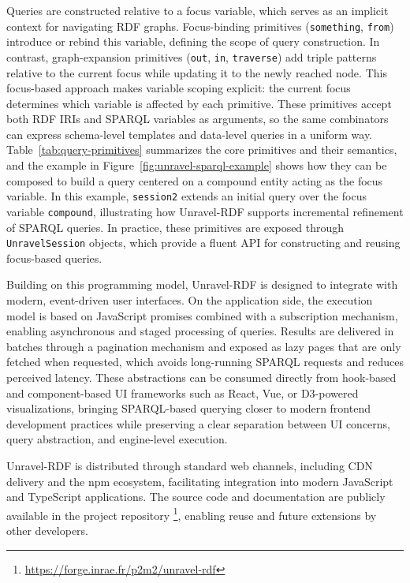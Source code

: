 \documentclass[
]{ceurart}
\begin{document}
Queries are constructed relative to a focus variable, which serves as
an implicit context for navigating RDF graphs. Focus-binding primitives
(\texttt{something}, \texttt{from}) introduce or rebind this variable,
defining the scope of query construction. In contrast, graph-expansion
primitives (\texttt{out}, \texttt{in}, \texttt{traverse}) add triple
patterns relative to the current focus while updating it to the newly
reached node. This focus-based approach makes variable scoping explicit:
the current focus determines which variable is affected by each
primitive. These primitives accept both RDF IRIs and SPARQL variables as
arguments, so the same combinators can express schema-level templates
and data-level queries in a uniform way. Table~\ref{tab:query-primitives}
summarizes the core primitives and their semantics, and the example in
Figure~\ref{fig:unravel-sparql-example} shows how they can be composed
to build a query centered on a compound entity acting as the focus
variable. In this example, \texttt{session2} extends an initial query
over the focus variable \texttt{compound}, illustrating how Unravel-RDF
supports incremental refinement of SPARQL queries. In practice, these
primitives are exposed through \texttt{UnravelSession} objects, which
provide a fluent API for constructing and reusing focus-based queries.

Building on this programming model, Unravel-RDF is designed to integrate
with modern, event-driven user interfaces. On the application side, the
execution model is based on JavaScript promises combined with a
subscription mechanism, enabling asynchronous and staged processing of
queries. Results are delivered in
batches through a pagination mechanism and exposed as lazy pages that
are only fetched when requested, which avoids long-running SPARQL
requests and reduces perceived latency. These abstractions can be
consumed directly from hook-based and component-based UI frameworks
such as React, Vue, or D3-powered visualizations, bringing SPARQL-based
querying closer to modern frontend development practices while
preserving a clear separation between UI concerns, query abstraction,
and engine-level execution.

Unravel-RDF is distributed through standard web channels, including
CDN delivery and the npm ecosystem, facilitating integration into
modern JavaScript and TypeScript applications. The source code and
documentation are publicly available in the project repository
\footnote{\url{https://forge.inrae.fr/p2m2/unravel-rdf}},
enabling reuse and future extensions by other developers.
\end{document}
